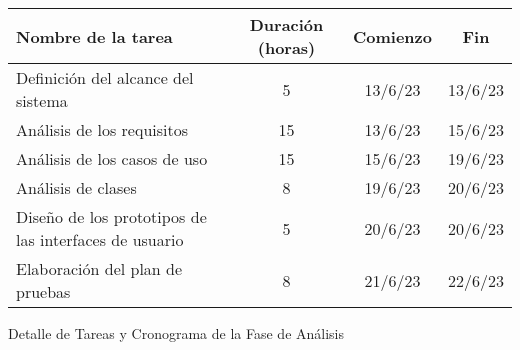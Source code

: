 \begin{planificacion}
	\centering
	\begin{tabular}{ | m{9cm} | c | c | c | }
		\hline
		\textbf{Nombre de la tarea}                           & \textbf{Duración (horas)} & \textbf{Comienzo} & \textbf{Fin} \\\hline
		Definición del alcance del sistema                    & 5                         & 13/6/23           & 13/6/23      \\\hline
		Análisis de los requisitos                            & 15                        & 13/6/23           & 15/6/23      \\\hline
		Análisis de los casos de uso                          & 15                        & 15/6/23           & 19/6/23      \\\hline
		Análisis de clases                                    & 8                         & 19/6/23           & 20/6/23      \\\hline
		Diseño de los prototipos de las interfaces de usuario & 5                         & 20/6/23           & 20/6/23      \\\hline
		Elaboración del plan de pruebas                       & 8                         & 21/6/23           & 22/6/23      \\\hline
	\end{tabular}
	\caption{Detalle de Tareas y Cronograma de la Fase de Análisis}
	\label{table:analysis_design_phase}
\end{planificacion}